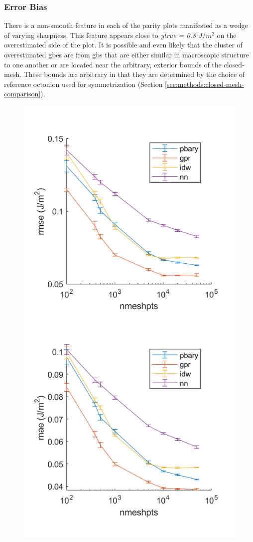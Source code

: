 \documentclass[preprint,12pt]{elsarticle}
\begin{document}
\subsubsection{Error Bias} \label{results:general:bias}
There is a non-smooth feature in each of the parity plots manifested as a wedge of varying sharpness. This feature appears close to \textit{ytrue = 0.8 $J/m^2$} on the overestimated side of the plot. It is possible and even likely that the cluster of overestimated \glspl{gbe} are from \glspl{gb} that are either similar in macroscopic structure to one another or are located near the arbitrary, exterior bounds of the closed-mesh. These bounds are arbitrary in that they are determined by the choice of reference octonion used for symmetrization (Section \ref{sec:methods:closed-mesh-comparison}).
    
\begin{figure}
    \centering
    \includegraphics{brkerror.png}

\end{figure}
\end{document}
